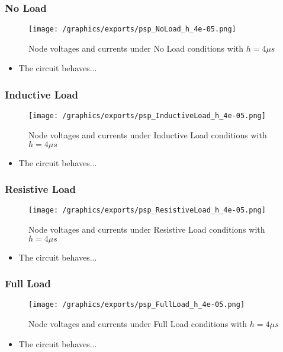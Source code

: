 \subsubsection{No Load}
\begin{figure}[H]
    \centering
    \texttt{[image: /graphics/exports/psp\_NoLoad\_h\_4e-05.png]}
    \caption{Node voltages and currents under No Load conditions with $h=4\mu s$}
\end{figure}
\begin{itemize}
	\item The circuit behaves...
\end{itemize}

\subsubsection{Inductive Load}
\begin{figure}[H]
    \centering
    \texttt{[image: /graphics/exports/psp\_InductiveLoad\_h\_4e-05.png]}
    \caption{Node voltages and currents under Inductive Load conditions with $h=4\mu s$}
\end{figure}
\begin{itemize}
	\item The circuit behaves...
\end{itemize}

\subsubsection{Resistive Load}
\begin{figure}[H]
    \centering
    \texttt{[image: /graphics/exports/psp\_ResistiveLoad\_h\_4e-05.png]}
    \caption{Node voltages and currents under Resistive Load conditions with $h=4\mu s$}
\end{figure}
\begin{itemize}
	\item The circuit behaves...
\end{itemize}

\subsubsection{Full Load}
\begin{figure}[H]
    \centering
    \texttt{[image: /graphics/exports/psp\_FullLoad\_h\_4e-05.png]}
    \caption{Node voltages and currents under Full Load conditions with $h=4\mu s$}
\end{figure}
\begin{itemize}
	\item The circuit behaves...
\end{itemize}

